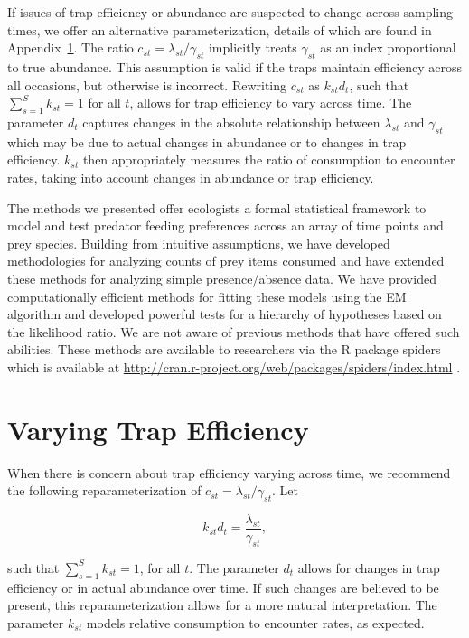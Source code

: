\documentclass[smallextended]{svjour3}
\begin{document}
If issues of trap efficiency or abundance are suspected to change across sampling times, we offer an alternative parameterization, details of which are found in Appendix~\ref{sec:efficiency}.  The ratio $c_{st} = \lambda_{st} / \gamma_{st}$ implicitly treats $\gamma_{st}$ as an index proportional to true abundance.  This assumption is valid if the traps maintain efficiency across all occasions, but otherwise is incorrect.  Rewriting $c_{st}$ as $k_{st}d_t$, such that $\sum_{s=1}^S k_{st} = 1$ for all $t$, allows for trap efficiency to vary across time.  The parameter $d_t$ captures changes in the absolute relationship between $\lambda_{st}$ and $\gamma_{st}$ which may be due to actual changes in abundance or to changes in trap efficiency.  $k_{st}$ then appropriately measures the ratio of consumption to encounter rates, taking into account changes in abundance or trap efficiency.

The methods we presented offer ecologists a formal statistical framework to model and test predator feeding preferences across an array of time points and prey species. Building from intuitive assumptions, we have developed methodologies for analyzing counts of prey items consumed and have extended these methods for analyzing simple presence/absence data. We have provided computationally efficient methods for fitting these models using the EM algorithm and developed powerful tests for a hierarchy of hypotheses based on the likelihood ratio. We are not aware of previous methods that have offered such abilities. These methods are available to researchers via the R package spiders which is available at \url{http://cran.r-project.org/web/packages/spiders/index.html} \citep{Roualdes:2014}. 

\appendix
\section{Varying Trap Efficiency}
\label{sec:efficiency}

When there is concern about trap efficiency varying across time,  we recommend the following reparameterization of $c_{st} = \lambda_{st}/\gamma_{st}$.  Let

\[ k_{st}d_t = \frac{\lambda_{st}}{\gamma_{st}}, \]

\noindent such that $\sum_{s=1}^S k_{st} = 1$, for all $t$.  The parameter $d_t$ allows for changes in trap efficiency or in actual abundance over time.  If such changes are believed to be present, this reparameterization allows for a more natural interpretation.  The parameter $k_{st}$ models relative consumption to encounter rates, as expected.
\end{document}
